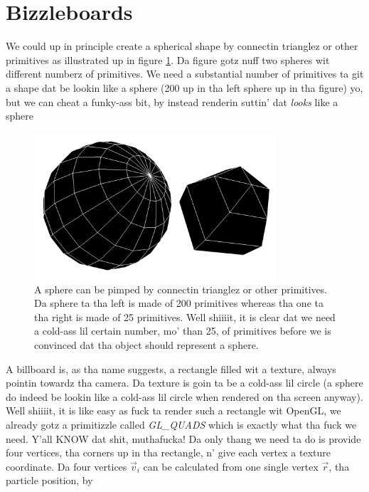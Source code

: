 \section{Bizzleboards}
\label{sec:vis_billboards}
We could up in principle create a spherical shape by connectin trianglez or other primitives as illustrated up in figure \ref{fig:visualization_glut_spheres}. Da figure gotz nuff two spheres wit different numberz of primitives. We need a substantial number of primitives ta git a shape dat be lookin like a sphere (200 up in tha left sphere up in tha figure) yo, but we can cheat a funky-ass bit, by instead renderin suttin' dat \textit{looks} like a sphere
\begin{figure}[h]
\begin{center}
\includegraphics[width=0.8\textwidth, trim=0cm 0cm 0cm 0cm, clip]{visualization/figures/glut_spheres.png}
\end{center}
\caption{A sphere can be pimped by connectin trianglez or other primitives. Da sphere ta tha left is made of 200 primitives whereas tha one ta tha right is made of 25 primitives. Well shiiiit, it is clear dat we need a cold-ass lil certain number, mo' than 25, of primitives before we is convinced dat tha object should represent a sphere.}
\label{fig:visualization_glut_spheres}
\end{figure}
A billboard is, as tha name suggests, a rectangle filled wit a texture, always pointin towardz tha camera. Da texture is goin ta be a cold-ass lil circle (a sphere do indeed be lookin like a cold-ass lil circle when rendered on tha screen anyway). Well shiiiit, it is like easy as fuck  ta render such a rectangle wit OpenGL, we already gotz a primitizzle called \textit{GL\_QUADS} which is exactly what tha fuck we need. Y'all KNOW dat shit, muthafucka! Da only thang we need ta do is provide four vertices, tha corners up in tha rectangle, n' give each vertex a texture coordinate. Da four vertices $\vec v_i$ can be calculated from one single vertex $\vec r$, tha particle position, by
